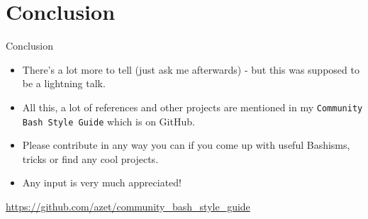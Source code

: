 \section{Conclusion}\label{conclusion}

\begin{frame}{Conclusion}

\begin{itemize}
\itemsep1pt\parskip0pt
\item
  There's a lot more to tell (just ask me afterwards) - but this was
  supposed to be a lightning talk.
\item
  All this, a lot of references and other projects are mentioned in my
  \texttt{Community Bash Style Guide} which is on GitHub.
\item
  Please contribute in any way you can if you come up with useful
  Bashisms, tricks or find any cool projects.
\item
  Any input is very much appreciated!
\end{itemize}

\huge \url{https://github.com/azet/community_bash_style_guide}

\end{frame}
